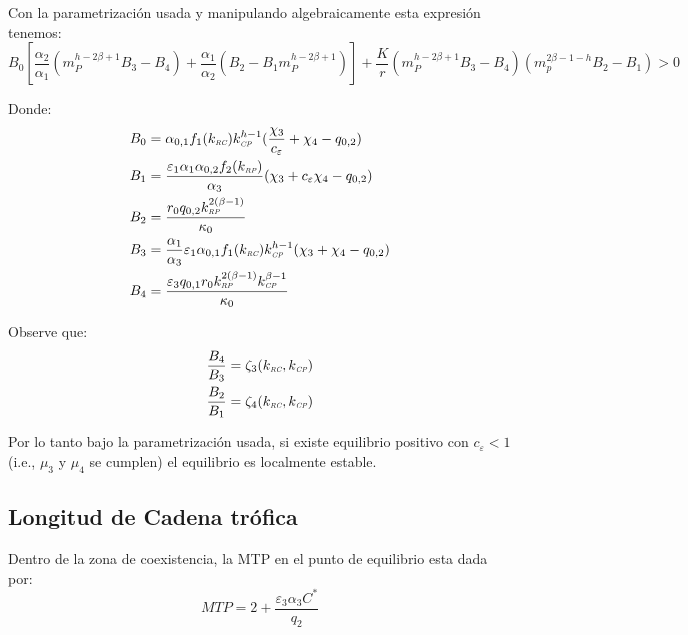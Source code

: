 Con la parametrizaci\'on usada y manipulando algebraicamente esta expresi\'on tenemos:
\begin{equation}
  B_0 [ \frac{\alpha_2}{\alpha_1}(m_P^{h - 2 \beta + 1} B_3 - B_4) + \frac{\alpha_1}{\alpha_2}(B_2 - B_1m_P^{h - 2 \beta + 1})]  +\frac{K}{r} (m_P^{h-2 \beta + 1} B_3 - B_4) (m_p^{2 \beta - 1 - h} B_2 - B_1)  > 0
\end{equation}

Donde:
\begin{equation}
  \begin{aligned}
    B_0 &= \alpha_{0,1}f_1(k_{\textit{\tiny RC}})k_{\textit{\tiny CP}}^{h - 1} ( \frac{\chi_3}{c_\varepsilon} + \chi_4 - q_{0,2})\\
    B_1 &= \frac{\varepsilon_1 \alpha_1 \alpha_{0,2} f_2(k_{\textit{\tiny RP}})}{\alpha_3}(\chi_3 + c_\varepsilon \chi_4 - q_{0,2}) \\
    B_2 &= \frac{r_0 q_{0,2} k_{\textit{\tiny RP}}^{2(\beta - 1)} }{\kappa_0} \\
    B_3 &= \frac{\alpha_1}{\alpha_3} \varepsilon_1 \alpha_{0,1} f_1(k_{\textit{\tiny RC}}) k_{\textit{\tiny CP}}^{h - 1}(\chi_3 + \chi_4 - q_{0,2})\\
    B_4 &= \frac{\varepsilon_3 q_{0,1} r_0 k_{\textit{\tiny RP}}^{2(\beta - 1)} k_{\textit{\tiny CP}}^{\beta - 1}}{\kappa_0}
  \end{aligned}
\end{equation}

Observe que:
\begin{equation}
  \begin{aligned}
    \frac{B_4}{B_3} &= \zeta_3(k_{\textit{\tiny RC}},k_{\textit{\tiny CP}}) \\
    \frac{B_2}{B_1} &= \zeta_4(k_{\textit{\tiny RC}},k_{\textit{\tiny CP}})
  \end{aligned}
\end{equation}

Por lo tanto bajo la parametrizaci\'on usada, si existe equilibrio positivo con $c_\varepsilon < 1$(i.e.,  $\mu_3$ y $\mu_4$ se cumplen) el equilibrio es localmente estable.\\

\subsection{Longitud de Cadena tr\'ofica}

Dentro de la zona de coexistencia, la MTP en el punto de equilibrio esta dada por:
\begin{equation}
  MTP = 2 + \frac{\varepsilon_3 \alpha_3 C^*}{q_2}
\end{equation}

